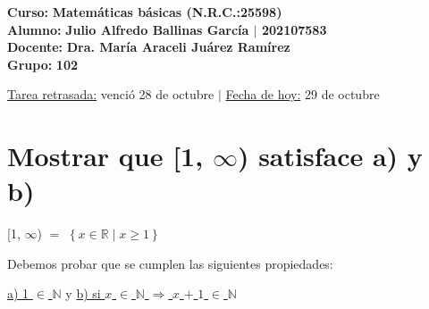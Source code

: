 \documentclass[12pt]{article}
\newenvironment{MyColorPar}[1]{%
    \leavevmode\color{#1}\ignorespaces%
}{%
}%
\begin{document}
    \large{\bf{\textsf{Curso:}}} {\bfseries{{\textcolor{brightturquoise}{Matemáticas básicas \bfseries{(N.R.C.:25598)}}}}} \\
    \large{\bf{\textsf{Alumno:}}} {\bfseries{{\textcolor{prussianblue}{Julio Alfredo Ballinas García {\large{{$\mid$}}} 202107583}}}}  \\
    \large{\bf{\textsf{Docente:}}} {\bfseries{{\textcolor{wisteria}{Dra. María Araceli Juárez Ramírez}}}}\\
    \large{\bf{\textsf{Grupo:}}} {\bfseries{{\textcolor{verde_manzana}{102}}}}\\

\vfill
    
\begin{center} 

    {\small{\textsf{\underline{Tarea retrasada:} venció 28 de octubre {}} {\LARGE{ $\mid$ }}\textsf{{\underline{Fecha de hoy:}} 29 de octubre}}}
    
\end{center}

\newpage


\section{\textsf{Mostrar que [1, $\infty$) satisface a) y b)}} \vspace{0.5cm}

{\LARGE{[1, $\infty$) $=$ $\left\{ x \in \mathbb{R} \mid x \geq 1  \right\}$ }} \vspace{0.5cm}

{} \begin{MyColorPar}{verde_manzana}
Debemos probar que se cumplen las siguientes propiedades: 
\end{MyColorPar} \vspace{0.5cm}
\begin{center}
\begin{MyColorPar}{palatinateblue}
{\underline{a) 1 $\in$ $\mathbb{N}$}} \hspace{0.3cm} y \hspace{0.3cm} {\underline{b) si $x$ $\in$ $\mathbb{N}$ $\Longrightarrow$ $x$ $+$ $1$ $\in$ $\mathbb{N}$}}
\end{MyColorPar} \vspace{0.5cm}
\end{center}
\end{document}
